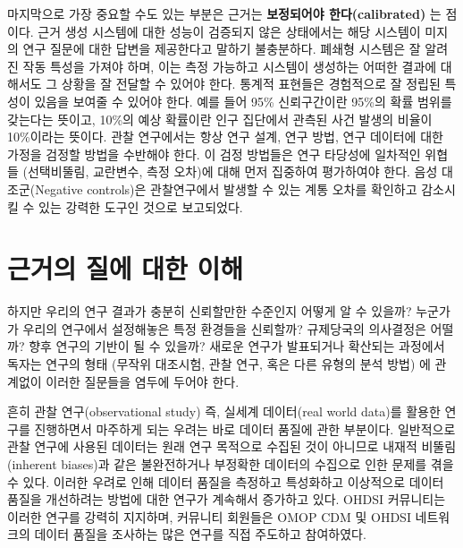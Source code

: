\documentclass[10.5pt]{book}
\theoremstyle{definition}
\theoremstyle{definition}
\theoremstyle{definition}
\theoremstyle{remark}
\begin{document}
마지막으로 가장 중요할 수도 있는 부분은 근거는 \textbf{보정되어야
한다(calibrated)} 는 점이다. 근거 생성 시스템에 대한 성능이 검증되지
않은 상태에서는 해당 시스템이 미지의 연구 질문에 대한 답변을 제공한다고
말하기 불충분하다. 폐쇄형 시스템은 잘 알려진 작동 특성을 가져야 하며,
이는 측정 가능하고 시스템이 생성하는 어떠한 결과에 대해서도 그 상황을 잘
전달할 수 있어야 한다. 통계적 표현들은 경험적으로 잘 정립된 특성이
있음을 보여줄 수 있어야 한다. 예를 들어 95\% 신뢰구간이란 95\%의 확률
범위를 갖는다는 뜻이고, 10\%의 예상 확률이란 인구 집단에서 관측된 사건
발생의 비율이 10\%이라는 뜻이다. 관찰 연구에서는 항상 연구 설계, 연구
방법, 연구 데이터에 대한 가정을 검정할 방법을 수반해야 한다. 이 검정
방법들은 연구 타당성에 일차적인 위협들 (선택비뚤림, 교란변수, 측정
오차)에 대해 먼저 집중하여 평가하여야 한다. 음성 대조군(Negative
controls)은 관찰연구에서 발생할 수 있는 계통 오차를 확인하고 감소시킬 수
있는 강력한 도구인 것으로 보고되었다.
\citep{schuemie_2016, schuemie_2018, schuemie_2018b}

\section{근거의 질에 대한 이해}\label{---}

하지만 우리의 연구 결과가 충분히 신뢰할만한 수준인지 어떻게 알 수
있을까? 누군가가 우리의 연구에서 설정해놓은 특정 환경들을 신뢰할까?
규제당국의 의사결정은 어떨까? 향후 연구의 기반이 될 수 있을까? 새로운
연구가 발표되거나 확산되는 과정에서 독자는 연구의 형태 (무작위 대조시험,
관찰 연구, 혹은 다른 유형의 분석 방법) 에 관계없이 이러한 질문들을
염두에 두어야 한다. 

흔히 관찰 연구(observational study) 즉, 실세계 데이터(real world data)를
활용한 연구를 진행하면서 마주하게 되는 우려는 바로 데이터 품질에 관한
부분이다. \citep{botsis2010secondary, hersh2013caveats, sherman2016real}
일반적으로 관찰 연구에 사용된 데이터는 원래 연구 목적으로 수집된 것이
아니므로 내재적 비뚤림(inherent biases)과 같은 불완전하거나 부정확한
데이터의 수집으로 인한 문제를 겪을 수 있다. 이러한 우려로 인해 데이터
품질을 측정하고 특성화하고 이상적으로 데이터 품질을 개선하려는 방법에
대한 연구가 계속해서 증가하고 있다.
\citep{kahn2012pragmatic, liaw2013towards, weiskopf_2013} OHDSI
커뮤니티는 이러한 연구를 강력히 지지하며, 커뮤니티 회원들은 OMOP CDM 및
OHDSI 네트워크의 데이터 품질을 조사하는 많은 연구를 직접 주도하고
참여하였다.
\citep{huser_multisite_2016, kahn_transparent_2015, callahan2017comparison, yoon_2016}
 
\end{document}
